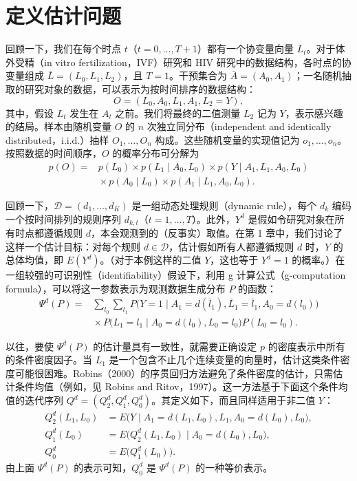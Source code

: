 \section{定义估计问题}
\label{sec:ch03-estimation-problem}

回顾一下，我们在每个时点 $t$（$t=0,\ldots,T+1$）都有一个协变量向量 $L_t$。对于体外受精（in vitro fertilization，IVF）研究和 HIV 研究中的数据结构，各时点的协变量组成 $\bar L=(L_0,L_1,L_2)$，且 $T=1$。干预集合为 $\bar A=(A_0,A_1)$；一名随机抽取的研究对象的数据，可以表示为按时间排序的数据结构：
\[
 O=(L_0,A_0,L_1,A_1,L_2=Y),
\]
其中，假设 $L_t$ 发生在 $A_t$ 之前。我们将最终的二值测量 $L_2$ 记为 $Y$，表示感兴趣的结局。样本由随机变量 $O$ 的 $n$ 次独立同分布（independent and identically distributed，i.i.d.）抽样 $O_1,\ldots,O_n$ 构成。这些随机变量的实现值记为 $o_1,\ldots,o_n$。按照数据的时间顺序，$O$ 的概率分布可分解为
\[
 \begin{aligned}
 p(O)={}&p(L_0)\times p(L_1\mid A_0,L_0)
             \times p(Y\mid A_1,L_1,A_0,L_0)\\
       &{}\times p(A_0\mid L_0)\times p(A_1\mid L_1,A_0,L_0).
 \end{aligned}
\]

回顾一下，$\mathcal D=(d_1,\ldots,d_K)$ 是一组动态处理规则（dynamic rule），每个 $d_k$ 编码一个按时间排列的规则序列 $d_{k,t}$（$t=1,\ldots,T$）。此外，$Y^d$ 是假如令研究对象在所有时点都遵循规则 $d$，本会观测到的（反事实）取值。在第 1 章中，我们讨论了这样一个估计目标：对每个规则 $d\in\mathcal D$，估计假如所有人都遵循规则 $d$ 时，$Y$ 的总体均值，即 $E(Y^d)$。（对于本例这样的二值 $Y$，这也等于 $Y^d=1$ 的概率。）在一组较强的可识别性（identifiability）假设下，利用 g 计算公式（g-computation formula），可以将这一参数表示为观测数据生成分布 $P$ 的函数：
\[
 \begin{aligned}
 \Psi^d(P)={}&\sum_{l_0}\sum_{l_1}
 P\bigl(Y=1\mid A_1=d(\bar l_1),\bar L_1=\bar l_1,A_0=d(l_0)\bigr)\\
 &{}\times P\bigl(L_1=l_1\mid A_0=d(l_0),L_0=l_0\bigr)P(L_0=l_0).
 \end{aligned}
\]

以往，要使 $\Psi^d(P)$ 的估计量具有一致性，就需要正确设定 $p$ 的密度表示中所有的条件密度因子。当 $L_1$ 是一个包含不止几个连续变量的向量时，估计这类条件密度可能很困难。Robins（2000）的序贯回归方法避免了条件密度的估计，只需估计条件均值（例如，见 Robins and Ritov，1997）。这一方法基于下面这个条件均值的迭代序列 $Q^d=(Q^d_2,Q^d_1,Q^d_0)$。其定义如下，而且同样适用于非二值 $Y$：
\[
 \begin{aligned}
 Q^d_2(L_1,L_0)
   &=E\bigl(Y\mid A_1=d(L_1,L_0),L_1,A_0=d(L_0),L_0\bigr),\\
 Q^d_1(L_0)
   &=E\bigl(Q^d_2(L_1,L_0)\mid A_0=d(L_0),L_0\bigr),\\
 Q^d_0&=E\bigl(Q^d_1(L_0)\bigr).
 \end{aligned}
\]
由上面 $\Psi^d(P)$ 的表示可知，$Q^d_0$ 是 $\Psi^d(P)$ 的一种等价表示。

